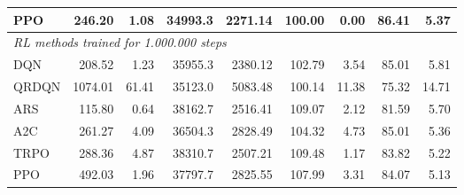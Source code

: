 \begin{samepage}
\begin{center}
\begin{tabular}{l|rr|rr|rr|rr}
    PPO          &   246.20 &     1.08 &    34993.3 &    2271.14 &  100.00 &    0.00 &   86.41 &    5.37 \\
    \midrule
    \multicolumn{9}{l}{\textit{RL methods trained for 1.000.000 steps}} \\
    \midrule
    DQN          &   208.52 &     1.23 &    35955.3 &    2380.12 &  102.79 &    3.54 &   85.01 &    5.81 \\
    QRDQN        &  1074.01 &    61.41 &    35123.0 &    5083.48 &  100.14 &   11.38 &   75.32 &   14.71 \\
    ARS          &   115.80 &     0.64 &    38162.7 &    2516.41 &  109.07 &    2.12 &   81.59 &    5.70 \\
    A2C          &   261.27 &     4.09 &    36504.3 &    2828.49 &  104.32 &    4.73 &   85.01 &    5.36 \\
    TRPO         &   288.36 &     4.87 &    38310.7 &    2507.21 &  109.48 &    1.17 &   83.82 &    5.22 \\
    PPO          &   492.03 &     1.96 &    37797.7 &    2825.55 &  107.99 &    3.31 &   84.07 &    5.13 \\
    \bottomrule
  \end{tabular}
\end{center}
\end{samepage}

